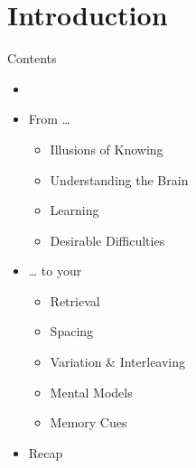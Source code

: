 \documentclass{ercisbeamer}
\begin{document}
\section{Introduction}
\begin{frame}{Contents}
    \begin{itemize}
        \item {}
        \item From …
        \begin{itemize}
            \item Illusions of Knowing
            \item Understanding the Brain
            \item Learning
            \item Desirable Difficulties
        \end{itemize}
        \item … to your 
        \begin{itemize}
            \item Retrieval
            \item Spacing
            \item Variation \& Interleaving
            \item Mental Models
            \item Memory Cues
        \end{itemize}
        \item Recap
    \end{itemize}
\end{frame}
\end{document}
